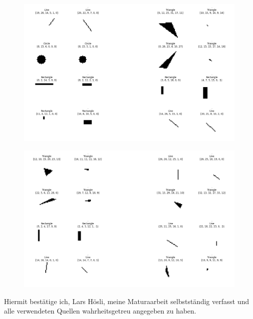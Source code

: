 \documentclass[12pt, a4paper, titlepage]{report}
\begin{document}
\begin{figure}[H]
   \includegraphics[width=1.0\textwidth]{../rc/images/all_shapes_approx_visual2.png}
   \label{fig:results_demonstration2}
\end{figure}

\begin{figure}[H]
   \includegraphics[width=1.0\textwidth]{../rc/images/all_shapes_approx_visual3.png}
   \label{fig:results_demonstration3}
\end{figure}




\pagebreak

Hiermit bestätige ich, Lars Hösli, meine Maturaarbeit selbstständig verfasst
und alle verwendeten Quellen wahrheitsgetreu angegeben zu haben.
\end{document}
